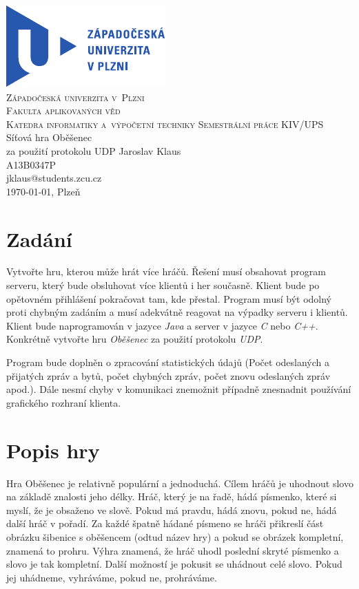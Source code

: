 \documentclass[12pt, a4paper]{article}
\begin{document}
	\begin{titlepage}
		\begin{center}
			\includegraphics{img/ZCULogo.pdf}\\[1cm]
			\textsc{\LARGE Západočeská univerzita v~Plzni}\\[0.1cm]
			\textsc{\Large Fakulta aplikovaných věd}\\[0.1cm]
			\textsc{\large Katedra informatiky a~výpočetní techniky}
			\vfill
			\textsc{\LARGE Semestrální práce KIV/UPS}\\[0.2cm]
			\Large{Síťová hra Oběšenec\\za použití protokolu UDP}
			\vfill
			Jaroslav Klaus\\
			A13B0347P\\
			jklaus@students.zcu.cz\\[0.2cm]
			\today, Plzeň
		\end{center}
	\end{titlepage}

	\tableofcontents
	\newpage

	\section{Zadání}
	Vytvořte hru, kterou může hrát více hráčů. Řešení musí obsahovat program serveru, který bude obsluhovat více klientů i her současně. Klient bude po opětovném přihlášení pokračovat tam, kde přestal. Program musí být odolný proti chybným zadáním a musí adekvátně reagovat na výpadky serveru i klientů. Klient bude naprogramován v jazyce \emph{Java} a server v jazyce \emph{C} nebo \emph{C++}. Konkrétně vytvořte hru \emph{Oběšenec} za použití protokolu \emph{UDP}.
	
	Program bude doplněn o zpracování statistických údajů (Počet odeslaných a přijatých zpráv a bytů, počet chybných zpráv, počet znovu odeslaných zpráv apod.). Dále nesmí chyby v komunikaci znemožnit případně znesnadnit používání grafického rozhraní klienta.
	
	\section{Popis hry}
	Hra Oběšenec je relativně populární a jednoduchá. Cílem hráčů je uhodnout slovo na základě znalosti jeho délky. Hráč, který je na řadě, hádá písmenko, které si myslí, že je obsaženo ve slově. Pokud má pravdu, hádá znovu, pokud ne, hádá další hráč v pořadí. Za každé špatně hádané písmeno se hráči přikreslí část obrázku šibenice s oběšencem (odtud název hry) a pokud se obrázek kompletní, znamená to prohru. Výhra znamená, že hráč uhodl poslední skryté písmenko a slovo je tak kompletní. Další možností je pokusit se uhádnout celé slovo. Pokud jej uhádneme, vyhráváme, pokud ne, prohráváme.
	
\end{document}
